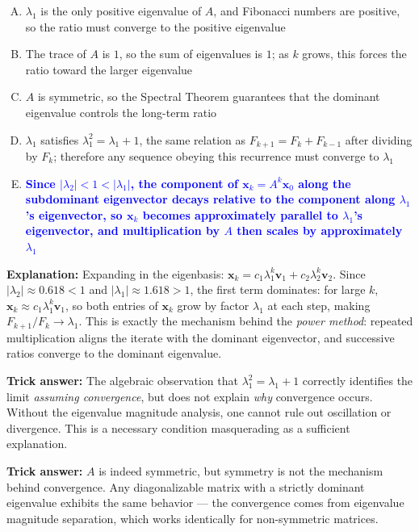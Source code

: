 \documentclass[12pt]{amsart}
\begin{document}
\begin{enumerate}[(A)]
\item $\lambda_1$ is the only positive eigenvalue of $A$, and Fibonacci
      numbers are positive, so the ratio must converge to the positive
      eigenvalue
\item The trace of $A$ is $1$, so the sum of eigenvalues is $1$; as
      $k$ grows, this forces the ratio toward the larger eigenvalue
\item $A$ is symmetric, so the Spectral Theorem guarantees that the
      dominant eigenvalue controls the long-term ratio
\item $\lambda_1$ satisfies $\lambda_1^2 = \lambda_1 + 1$, the same
      relation as $F_{k+1} = F_k + F_{k-1}$ after dividing by $F_k$;
      therefore any sequence obeying this recurrence must converge to
      $\lambda_1$
\item \textcolor{blue}{\textbf{Since $|\lambda_2| < 1 < |\lambda_1|$,
      the component of $\mathbf{x}_k = A^k\mathbf{x}_0$ along the
      subdominant eigenvector decays relative to the component along
      $\lambda_1$'s eigenvector, so $\mathbf{x}_k$ becomes
      approximately parallel to $\lambda_1$'s eigenvector, and
      multiplication by $A$ then scales by approximately $\lambda_1$}}
\end{enumerate}

\textbf{Explanation:}
Expanding in the eigenbasis:
$\mathbf{x}_k = c_1\lambda_1^k\mathbf{v}_1 + c_2\lambda_2^k\mathbf{v}_2$.
Since $|\lambda_2| \approx 0.618 < 1$ and $|\lambda_1| \approx 1.618 > 1$,
the first term dominates: for large $k$,
$\mathbf{x}_k \approx c_1\lambda_1^k\mathbf{v}_1$, so both entries of
$\mathbf{x}_k$ grow by factor $\lambda_1$ at each step, making
$F_{k+1}/F_k \to \lambda_1$. This is exactly the mechanism behind the
\emph{power method}: repeated multiplication aligns the iterate with the
dominant eigenvector, and successive ratios converge to the dominant
eigenvalue.

\textbf{Trick answer:}
The algebraic observation that $\lambda_1^2 = \lambda_1 + 1$ correctly
identifies the limit \emph{assuming convergence}, but does not explain
\emph{why} convergence occurs. Without the eigenvalue magnitude analysis,
one cannot rule out oscillation or divergence. This is a necessary condition
masquerading as a sufficient explanation.

\textbf{Trick answer:}
$A$ is indeed symmetric, but symmetry is not the mechanism behind
convergence. Any diagonalizable matrix with a strictly dominant eigenvalue
exhibits the same behavior --- the convergence comes from eigenvalue
magnitude separation, which works identically for non-symmetric matrices.
\end{document}

